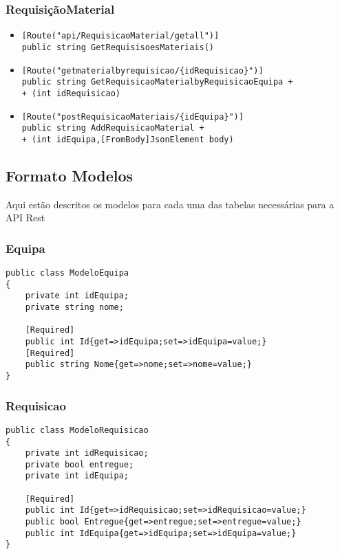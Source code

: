 \subsubsection{RequisiçãoMaterial}
\begin{itemize}
    \item \begin{lstlisting}
[Route("api/RequisicaoMaterial/getall")]
public string GetRequisisoesMateriais()
             \end{lstlisting}
\end{itemize}

\begin{itemize}
    \item \begin{lstlisting}
[Route("getmaterialbyrequisicao/{idRequisicao}")]
public string GetRequisicaoMaterialbyRequisicaoEquipa +
+ (int idRequisicao)
             \end{lstlisting}
\end{itemize}


\begin{itemize}
    \item \begin{lstlisting}
[Route("postRequisicaoMateriais/{idEquipa}")]
public string AddRequisicaoMaterial + 
+ (int idEquipa,[FromBody]JsonElement body)
             \end{lstlisting}
\end{itemize}

\subsection{Formato Modelos}
Aqui estão descritos os modelos para cada uma das tabelas necessárias para a API Rest
\subsubsection{Equipa}

\begin{lstlisting}
public class ModeloEquipa
{
    private int idEquipa;
    private string nome;

    [Required]
    public int Id{get=>idEquipa;set=>idEquipa=value;}
    [Required]
    public string Nome{get=>nome;set=>nome=value;}
}

\end{lstlisting}

\subsubsection{Requisicao}
\begin{lstlisting}
public class ModeloRequisicao
{
    private int idRequisicao;
    private bool entregue;
    private int idEquipa;

    [Required]
    public int Id{get=>idRequisicao;set=>idRequisicao=value;}
    public bool Entregue{get=>entregue;set=>entregue=value;}
    public int IdEquipa{get=>idEquipa;set=>idEquipa=value;}
}
\end{lstlisting}
\vfill
